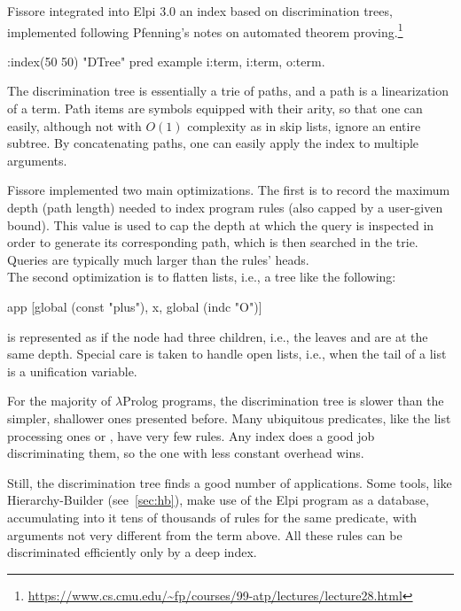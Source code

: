 \documentclass{these-ISSS}
\newenvironment{elpicode}
  {\VerbatimEnvironment\begin{elpibox}\begin{xelpicode}}{\end{xelpicode}
\end{elpibox}}
\begin{document}
Fissore integrated into Elpi 3.0 an index based on discrimination trees,
implemented following Pfenning's notes on automated theorem
proving.\footnote{\url{https://www.cs.cmu.edu/~fp/courses/99-atp/lectures/lecture28.html}}

\begin{elpicode}
:index(50 50) "DTree" %
pred example i:term, i:term, o:term.
\end{elpicode}


The discrimination tree is essentially a trie of paths, and a path is a
linearization of a term. Path items are symbols equipped with their arity, so
that one can easily, although not with $O(1)$ complexity as in skip lists,
ignore an entire subtree. By concatenating paths, one can easily apply the
index to multiple arguments.


Fissore implemented two main optimizations. The first is to record the maximum
depth (path length) needed to index program rules (also capped by a user-given
bound). This value is used to cap the depth at which the query is inspected in
order to generate its corresponding path, which is then searched in the trie.
Queries are typically much larger than the rules' heads.\\
The second optimization is to flatten lists, i.e., a tree like the following:
\begin{elpicode}
app [global (const "plus"), x, global (indc "O")]
\end{elpicode}
\noindent
is represented as if the  node had three children, i.e., the leaves
 and  are at the same depth. Special care is taken to
handle open lists, i.e., when the tail of a list is a unification variable.


For the majority of $\lambda$Prolog programs, the discrimination tree is
slower than the simpler, shallower ones presented before. Many ubiquitous
predicates, like the list processing ones  or , have very
few rules. Any index does a good job discriminating them, so the one with less
constant overhead wins.


Still, the discrimination tree finds a good number of applications. Some tools,
like Hierarchy-Builder (see~\cref{sec:hb}), make use of the Elpi program as a
database, accumulating into it tens of thousands of rules for the same
predicate, with arguments not very different from the term above. All these
rules can be discriminated efficiently only by a deep index.
\end{document}
